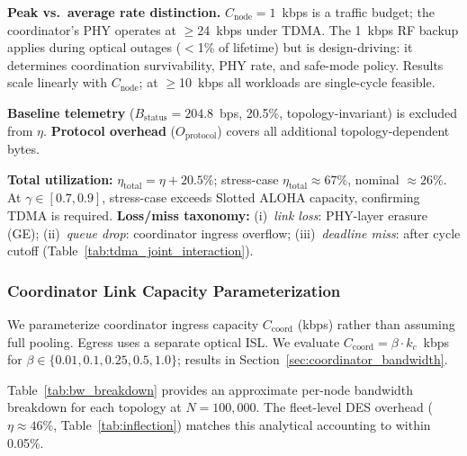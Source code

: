 \documentclass[journal]{IEEEtran}
\begin{document}
\textbf{Peak vs.\ average rate distinction.} $C_{\text{node}} = 1$~kbps is a traffic budget; the coordinator's PHY operates at $\geq$24~kbps under TDMA. The 1~kbps RF backup applies during optical outages ($<$1\% of lifetime) but is design-driving: it determines coordination survivability, PHY rate, and safe-mode policy. Results scale linearly with $C_{\text{node}}$; at $\geq$10~kbps all workloads are single-cycle feasible.

\textbf{Baseline telemetry} ($B_{\text{status}} = 204.8$~bps, 20.5\%, topology-invariant) is excluded from $\eta$. \textbf{Protocol overhead} ($O_{\text{protocol}}$) covers all additional topology-dependent bytes.

\textbf{Total utilization:} $\eta_{\text{total}} = \eta + 20.5\%$; stress-case $\eta_{\text{total}} \approx 67\%$, nominal $\approx 26\%$. At $\gamma \in [0.7, 0.9]$, stress-case exceeds Slotted ALOHA capacity, confirming TDMA is required. \textbf{Loss/miss taxonomy:} (i)~\emph{link loss}: PHY-layer erasure (GE); (ii)~\emph{queue drop}: coordinator ingress overflow; (iii)~\emph{deadline miss}: after cycle cutoff (Table~\ref{tab:tdma_joint_interaction}).

\subsubsection{Coordinator Link Capacity Parameterization}

We parameterize coordinator ingress capacity $C_{\text{coord}}$ (kbps) rather than assuming full pooling. Egress uses a separate optical ISL. We evaluate $C_{\text{coord}} = \beta \cdot k_c$~kbps for $\beta \in \{0.01, 0.1, 0.25, 0.5, 1.0\}$; results in Section~\ref{sec:coordinator_bandwidth}.

Table~\ref{tab:bw_breakdown} provides an approximate per-node bandwidth breakdown for each topology at $N = 100{,}000$. The fleet-level DES overhead ($\eta \approx 46\%$, Table~\ref{tab:inflection}) matches this analytical accounting to within 0.05\%.
\end{document}
